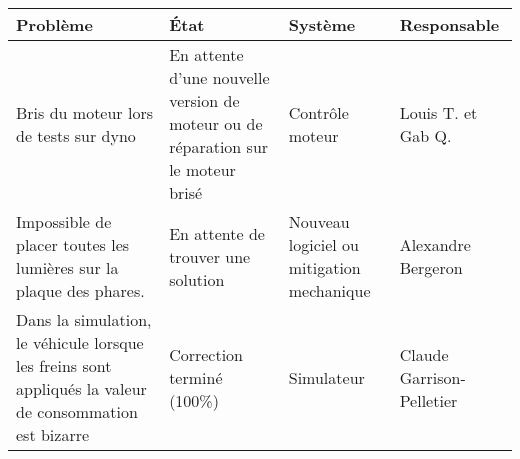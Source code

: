 \begin{tabularx}{\linewidth}{
    |>{\hsize=1.5\hsize}X|%
    >{\hsize=0.5\hsize}X|%
    >{\hsize=0.5\hsize}X|%
    >{\hsize=0.5\hsize}X|%
  }
    \hline
    \textbf{Problème} & \textbf{État} & \textbf{Système} & \textbf{Responsable}\\\hline
    Bris du moteur lors de tests sur dyno & En attente d'une nouvelle version de moteur ou de réparation sur le moteur brisé & Contrôle moteur & Louis T. et Gab Q.\\\hline
   Impossible de placer toutes les lumières sur la plaque des phares. & En attente de trouver une solution & Nouveau logiciel ou mitigation mechanique & Alexandre Bergeron \\\hline %
   Dans la simulation, le véhicule lorsque les freins sont appliqués la valeur de consommation est bizarre & Correction terminé (100\%) & Simulateur & Claude Garrison-Pelletier\\\hline %
  \end{tabularx}
    
    
